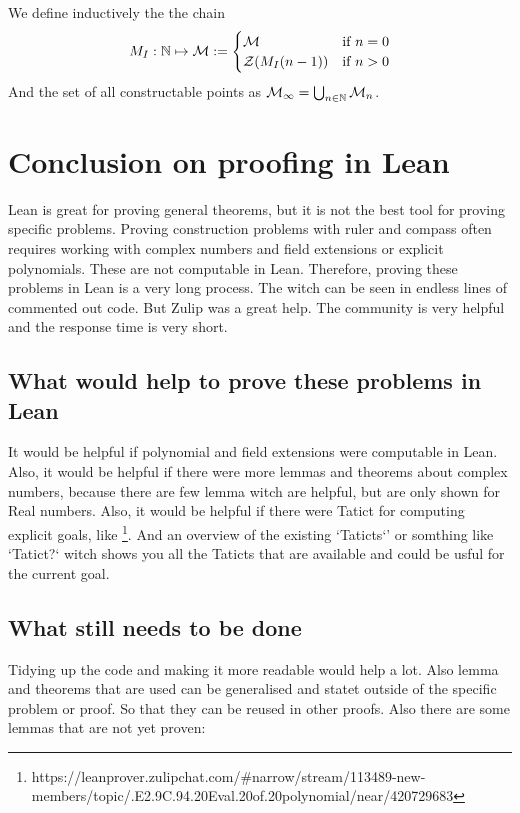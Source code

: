 \documentclass{../Proof_layout_PDF/TemplateExercise}
\begin{document}
\begin{definition}
    We define inductively the the chain
    \begin{equation*}
         M_I :  \mathbb{N} \mapsto \mathcal{M} := \begin{cases}
            \mathcal{M} & \text{if } n = 0 \\
            \mathcal{Z}(M_I(n-1)) & \text{if } n > 0
        \end{cases}
    \end{equation*}
    And the set of all constructable points as $\mathcal{M}_{\infty} = \bigcup_{n \in \mathbb{N}} \mathcal{M}_n$.
\end{definition}

\section{Conclusion on proofing in Lean}
Lean is great for proving general theorems, but it is not the best tool for proving specific problems.
Proving construction problems with ruler and compass often requires working with complex numbers and field extensions or explicit polynomials.
These are not computable in Lean. Therefore, proving these problems in Lean is a very long process. The witch can be seen in endless lines of commented out code. \newline
But Zulip was a great help. The community is very helpful and the response time is very short.
\subsection{What would help to prove these problems in Lean}
It would be helpful if polynomial and field extensions were computable in Lean. Also, it would be helpful if there were more lemmas and theorems about complex numbers, because there are few lemma witch are helpful, but are only shown for Real numbers.  \newline
Also, it would be helpful if there were Tatict for computing explicit goals, like \footnote{https://leanprover.zulipchat.com/#narrow/stream/113489-new-members/topic/.E2.9C.94.20Eval.20of.20polynomial/near/420729683}. \newline
And an overview of the existing `Taticts`' or somthing like `Tatict?` witch shows you all the Taticts that are available and could be usful for the current goal.

\subsection{What still needs to be done}
Tidying up the code and making it more readable would help a lot. Also lemma and theorems that are used can be generalised and statet outside of the specific problem or proof. So that they can be reused in other proofs. \newline
Also there are some lemmas that are not yet proven:
\end{document}
